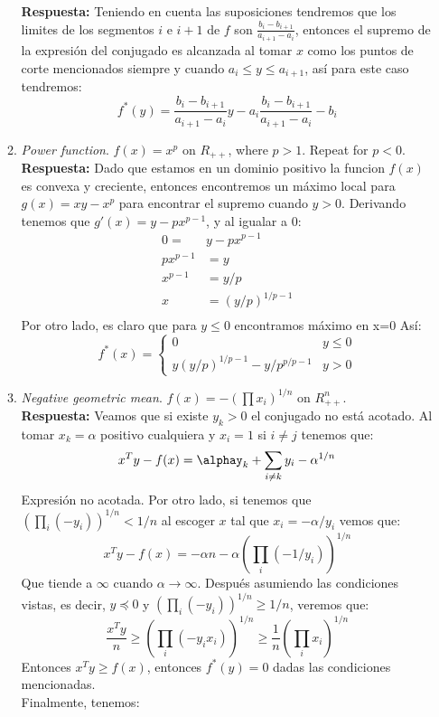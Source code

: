 \documentclass[12pt, oneside]{article}%
\begin{document}
\begin{enumerate}
\begin{enumerate}
    \textbf{Respuesta:}
    Teniendo en cuenta las suposiciones tendremos que los limites de los segmentos $i$ e $i+1$ de $f$ son $\frac{b_i-b_{i+1}}{a_{i+1}-a_i}$, entonces el supremo de la expresión del conjugado es alcanzada al tomar $x$ como los puntos de corte mencionados siempre y cuando $a_i\leq y\leq a_{i+1}$, así para este caso tendremos:
    $$f^*(y)=\frac{b_i-b_{i+1}}{a_{i+1}-a_i}y - a_i\frac{b_i-b_{i+1}}{a_{i+1}-a_i}-b_i$$
   \item \textit{Power function}. $f(x) = x^p$ on $R_{++}$, where $p > 1$. Repeat for $p < 0$. \\ 
    \textbf{Respuesta:}
     Dado que estamos en un dominio positivo la funcion $f(x)$ es convexa y creciente, entonces encontremos un máximo local para $g(x)=xy-x^p$ para encontrar el supremo cuando $y> 0$. Derivando tenemos que $g'(x)=y-px^{p-1}$, y al igualar a 0:
     \begin{align*}
         0=&y-px^{p-1}\\
         px^{p-1}&=y\\
         x^{p-1}&=y/p\\
         x&=(y/p)^{1/p-1}\\
     \end{align*}
     Por otro lado, es claro que para $y\leq 0$ encontramos máximo en x=0
     Así:
     $$f^*(x)=\begin{cases}
     0 & y\leq 0\\
     y(y/p)^{1/p-1}-y/p^{p/p-1} & y>0
     \end{cases}$$
    \item \textit{Negative geometric mean}. $f(x) = -(\prod x_i)^{1/n}$ on $R_{++}^n.$ \\
    \textbf{Respuesta:}
    Veamos que si existe $y_k>0$ el conjugado no está acotado. Al tomar $x_k=\alpha$ positivo cualquiera y $x_i=1$ si $i\neq j$ tenemos que:
    $$x^Ty-f(x)=\alphay_k+\sum_{i\neq k} y_i -\alpha^{1/n}$$
    Expresión no acotada.
    Por otro lado, si tenemos que $(\prod_i(-y_i))^{1/n}<1/n$ al escoger $x$ tal que $x_i=-\alpha/y_i$ vemos que:
    $$x^Ty-f(x)=-\alpha n -\alpha \left(\prod_i (-1/y_i)\right)^{1/n}$$
    Que tiende a $\infty$ cuando $\alpha\to\infty $.
    Después asumiendo las condiciones vistas, es decir, $y\preceq 0$ y $(\prod_i(-y_i))^{1/n}\geq1/n$, veremos que:
    $$\frac{x^Ty}{n}\geq \left(\prod_i (-y_ix_i)\right)^{1/n} \geq \frac1n\left(\prod_i x_i\right)^{1/n}$$
    Entonces $x^Ty\geq f(x)$, entonces $f^*(y)=0$ dadas las condiciones mencionadas.\\
    Finalmente, tenemos:

\end{enumerate}
\end{enumerate}
\end{document}
